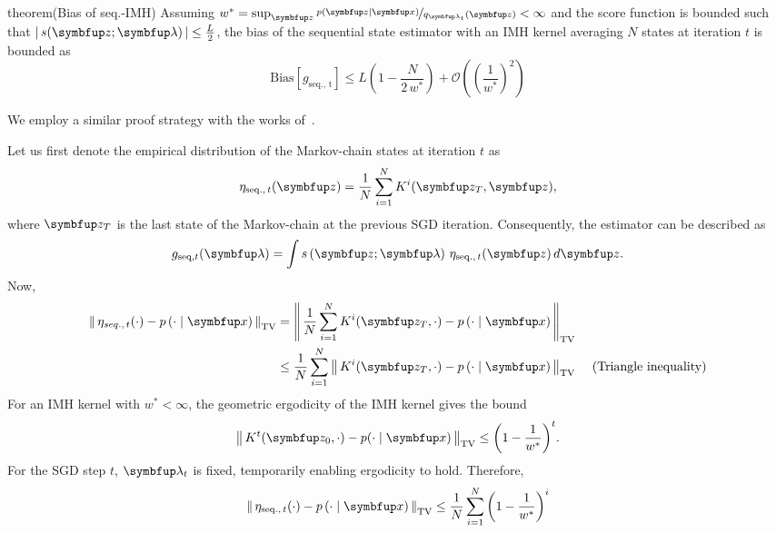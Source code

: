 
\begin{theoremEnd}{theorem}(Bias of seq.-IMH)\label{thm:bias_seq}
  Assuming \(w^* = \sup_{\vz} \nicefrac{p\left(\vz\mid\vx\right)}{q_{\vlambda_{t}}\left(\vz\right)} < \infty\) and the score function is bounded such that \(\left|\,s(\vz; \vlambda)\,\right| \leq \frac{L}{2}\), the bias of the sequential state estimator with an IMH kernel averaging \(N\) states at iteration \(t\) is bounded as
  {\small
  \[
  \mathrm{Bias}\left[ g_{\mathrm{seq.,\, t}} \right] \leq L \left( 1 - \frac{N}{2 \, w^*} \right) + \mathcal{O}\left({\left(\frac{1}{w^*}\right)}^2\right)
  \]
  }
\end{theoremEnd}
%
\begin{proofEnd}
  We employ a similar proof strategy with the works of~\citet[Theorem 4]{jiang_mcmc_2021}.

  Let us first denote the empirical distribution of the Markov-chain states at iteration \(t\) as
  \begin{align}
    \eta_{\mathrm{seq.},\, t}(\vz) = \frac{1}{N} \sum_{i=1}^N K^{i}(\vz_T, \vz),
  \end{align}
  where \(\vz_{T}\) is the last state of the Markov-chain at the previous SGD iteration.
  Consequently, the estimator can be described as
  \begin{align}
      g_{\mathrm{seq}, t}(\vlambda) = \int s\left(\vz; \vlambda\right) \, \eta_{\mathrm{seq.},\, t}(\vz) \, d\vz.
  \end{align}
  Now,
  \begin{align}
    \DTV{ \eta_{seq.,\, t}(\cdot) }{p\left(\cdot\mid\vx\right)}
    &= \DTV{\frac{1}{N} \sum_{i=1}^N K^{i}(\vz_T, \cdot)}{p\left(\cdot\mid\vx\right)} \\
    &\leq \frac{1}{N} \sum_{i=1}^N  \DTV{K^{i}(\vz_T, \cdot)}{p\left(\cdot\mid\vx\right)} &\text{ (Triangle inequality)}
  \end{align}
 For an IMH kernel with \(w^* < \infty\), the geometric ergodicity of the IMH kernel \citep[Theorem 2.1]{10.2307/2242610} gives the bound
 \begin{align}
   \DTV{K^t(\vz_{0}, \cdot)}{p(\cdot\mid\vx)} \leq {\left(1 - \frac{1}{w^*}\right)}^t.
 \end{align}
 For the SGD step \(t\), \(\vlambda_{t}\) is fixed, temporarily enabling ergodicity to hold.
 Therefore, 
  \begin{align}
    \DTV{ \eta_{\mathrm{seq.},\, t}(\cdot) }{p\left(\cdot\mid\vx\right)}
    &\leq \frac{1}{N} \sum_{i=1}^N {\left( 1 - \frac{1}{w^*} \right)}^i \\

\end{align}
\end{proofEnd}
